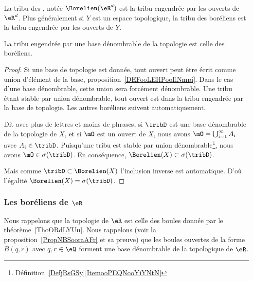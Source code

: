 \begin{definition}        \label{DEFooQBQGooTqGdtY}
    La tribu des , notée \( \Borelien(\eR^d)\) est la tribu engendrée par les ouverts de \( \eR^d\). Plus généralement si \( Y\) est un espace topologique, la tribu des boréliens est la tribu engendrée par les ouverts de \( Y\).
\end{definition}

\begin{proposition} \label{PROPooYEkvbWBz}
    La tribu engendrée par une base dénombrable de la topologie est celle des boréliens.
\end{proposition}

\begin{proof}
    Si une base de topologie est donnée, tout ouvert peut être écrit comme union d'élément de la base, proposition~\ref{DEFooLEHPooIlNmpi}. Dans le cas d'une base dénombrable, cette union sera forcément dénombrable. Une tribu étant stable par union dénombrable, tout ouvert est dans la tribu engendrée par la base de topologie. Les autres boréliens suivent automatiquement.

    Dit avec plus de lettres et moins de phrases, si \( \tribD\) est une base dénombrable de la topologie de \( X\), et si \( \mO\) est un ouvert de \( X\), nous avons \( \mO=\bigcup_{i=1}^{\infty}A_i\) avec \( A_i\in\tribD\). Puisqu'une tribu est stable par union dénombrable\footnote{Définition~\ref{DefjRsGSy}\ref{ItemooPEQNooYiYNtN}}, nous avons \( \mO\in\sigma(\tribD)\). En conséquence, \( \Borelien(X)\subset\sigma(\tribD)\).

    Mais comme \( \tribD\subset\Borelien(X)\) l'inclusion inverse est automatique. D'où l'égalité \( \Borelien(X)=\sigma(\tribD)\).
\end{proof}

\subsubsection{Les boréliens de \texorpdfstring{$ \eR$}{R}}

Nous rappelons que la topologie de \( \eR\) est celle des boules donnée par le théorème~\ref{ThoORdLYUu}. Nous rappelons (voir la proposition~\ref{PropNBSooraAFr} et sa preuve) que les boules ouvertes de la forme \( B(q,r)\) avec \( q,r\in \eQ\) forment une base dénombrable de la topologique de \( \eR\).

